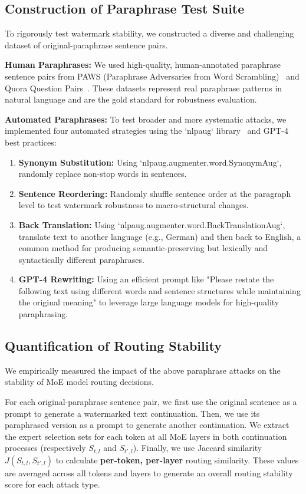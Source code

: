 \documentclass[letterpaper,twocolumn,10pt]{article}
\begin{document}
\subsection{Construction of Paraphrase Test Suite}

To rigorously test watermark stability, we constructed a diverse and challenging dataset of original-paraphrase sentence pairs.

\textbf{Human Paraphrases:} We used high-quality, human-annotated paraphrase sentence pairs from PAWS (Paraphrase Adversaries from Word Scrambling)~\cite{zhang2019paws} and Quora Question Pairs~\cite{quora2017}. These datasets represent real paraphrase patterns in natural language and are the gold standard for robustness evaluation.

\textbf{Automated Paraphrases:} To test broader and more systematic attacks, we implemented four automated strategies using the `nlpaug` library~\cite{nlpaug2019} and GPT-4 best practices:

\begin{enumerate}
\item \textbf{Synonym Substitution:} Using `nlpaug.augmenter.word.SynonymAug`, randomly replace non-stop words in sentences.
\item \textbf{Sentence Reordering:} Randomly shuffle sentence order at the paragraph level to test watermark robustness to macro-structural changes.
\item \textbf{Back Translation:} Using `nlpaug.augmenter.word.BackTranslationAug`, translate text to another language (e.g., German) and then back to English, a common method for producing semantic-preserving but lexically and syntactically different paraphrases.
\item \textbf{GPT-4 Rewriting:} Using an efficient prompt like "Please restate the following text using different words and sentence structures while maintaining the original meaning" to leverage large language models for high-quality paraphrasing.
\end{enumerate}

\subsection{Quantification of Routing Stability}

We empirically measured the impact of the above paraphrase attacks on the stability of MoE model routing decisions.

For each original-paraphrase sentence pair, we first use the original sentence as a prompt to generate a watermarked text continuation. Then, we use its paraphrased version as a prompt to generate another continuation. We extract the expert selection sets for each token at all MoE layers in both continuation processes (respectively $S_{t,l}$ and $S_{t',l}$). Finally, we use Jaccard similarity $J(S_{t,l}, S_{t',l})$ to calculate \textbf{per-token, per-layer} routing similarity. These values are averaged across all tokens and layers to generate an overall routing stability score for each attack type.
\end{document}
